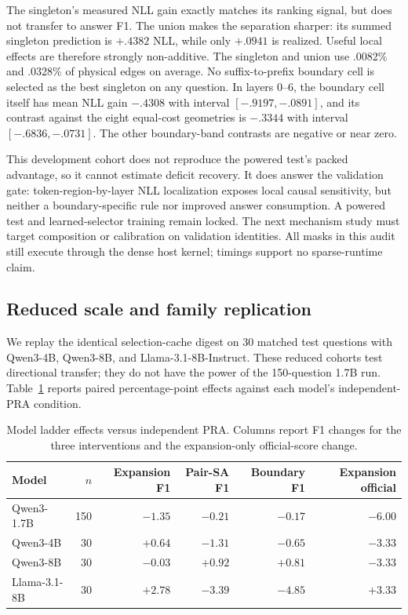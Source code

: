 \documentclass[11pt]{article}
\begin{document}
The singleton's measured NLL gain exactly matches its ranking signal, but does
not transfer to answer F1. The union makes the separation sharper: its summed
singleton prediction is $+.4382$ NLL, while only $+.0941$ is realized. Useful
local effects are therefore strongly non-additive. The singleton and union use
.0082\% and .0328\% of physical edges on average. No suffix-to-prefix boundary
cell is selected as the best singleton on any question. In layers 0--6, the
boundary cell itself has mean NLL gain $-.4308$ with interval
$[-.9197,-.0891]$, and its contrast against the eight equal-cost geometries is
$-.3344$ with interval $[-.6836,-.0731]$. The other boundary-band contrasts
are negative or near zero.

This development cohort does not reproduce the powered test's packed advantage,
so it cannot estimate deficit recovery. It does answer the validation gate:
token-region-by-layer NLL localization exposes local causal sensitivity, but
neither a boundary-specific rule nor improved answer consumption. A powered
test and learned-selector training remain locked. The next mechanism study
must target composition or calibration on validation identities. All masks in
this audit still execute through the dense host kernel; timings support no
sparse-runtime claim.
\FloatBarrier

\subsection{Reduced scale and family replication}

We replay the identical selection-cache digest on 30 matched test questions
with Qwen3-4B, Qwen3-8B, and Llama-3.1-8B-Instruct. These reduced cohorts test
directional transfer; they do not have the power of the 150-question 1.7B run.
Table~\ref{tab:expansion-ladder} reports paired percentage-point effects
against each model's independent-PRA condition.

\begin{table}[H]
\centering
\small
\caption{Model ladder effects versus independent PRA. Columns report F1
changes for the three interventions and the expansion-only official-score
change.}
\label{tab:expansion-ladder}
\begin{tabular}{lrrrrr}
\toprule
Model & $n$ & Expansion F1 & Pair-SA F1 & Boundary F1 & Expansion official \\
\midrule
Qwen3-1.7B & 150 & $-1.35$ & $-0.21$ & $-0.17$ & $-6.00$ \\
Qwen3-4B & 30 & $+0.64$ & $-1.31$ & $-0.65$ & $-3.33$ \\
Qwen3-8B & 30 & $-0.03$ & $+0.92$ & $+0.81$ & $-3.33$ \\
Llama-3.1-8B & 30 & $+2.78$ & $-3.39$ & $-4.85$ & $+3.33$ \\
\bottomrule
\end{tabular}
\end{table}
\end{document}
